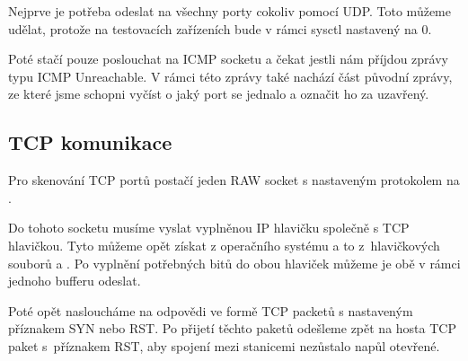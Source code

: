 \documentclass[../projekt.tex]{subfiles}
\begin{document}
Nejprve je potřeba odeslat na všechny porty cokoliv pomocí UDP. Toto můžeme udělat, protože na testovacích zařízeních bude v rámci sysctl nastavený  na 0.

Poté stačí pouze poslouchat na ICMP socketu a čekat jestli nám příjdou zprávy typu ICMP Unreachable. V rámci této zprávy také nachází část původní zprávy, ze které jsme schopni vyčíst o jaký port se jednalo a označit ho za uzavřený.

\subsection{TCP komunikace}\label{TCPComm}

Pro skenování TCP portů postačí jeden RAW socket s nastaveným protokolem na . 

Do tohoto socketu musíme vyslat vyplněnou IP hlavičku společně s TCP hlavičkou. Tyto můžeme opět získat z operačního systému a to z~hlavičkových souborů  a . Po vyplnění potřebných bitů do obou hlaviček můžeme je obě v rámci jednoho bufferu odeslat. 

Poté opět nasloucháme na odpovědi ve formě TCP packetů s nastaveným příznakem SYN nebo RST. Po přijetí těchto paketů odešleme zpět na hosta TCP paket s~příznakem RST, aby spojení mezi stanicemi nezůstalo napůl otevřené.
\end{document}
